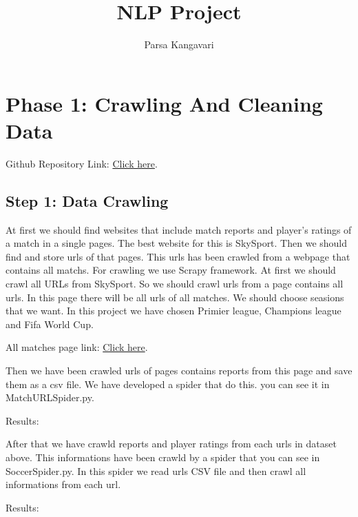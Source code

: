 \documentclass{article}
\title{NLP Project}
\author{Parsa Kangavari}
\begin{document}
 
\maketitle

\section{Phase 1: Crawling And Cleaning Data}
Github Repository Link: \href{https://github.com/rezakongo/soccer_report_analyst}{Click here}.


\subsection{Step 1: Data Crawling}
At first we should find websites that include match reports and player's ratings of a match in a single pages. The best website for this is SkySport.
Then we should find and store urls of that pages. This urls has been crawled from a webpage that contains all matchs. For crawling we use Scrapy framework.
At first we should crawl all URLs from SkySport. So we should crawl urls from a page contains all urls. In this page there will be all urls of all matches.
We should choose seasions that we want. In this project we have chosen Primier league, Champions league and Fifa World Cup.

All matches page link: \href{https://www.skysports.com/premier-league-results}{Click here}.


Then we have been crawled urls of pages contains reports from this page and save them as a csv file. We have developed a spider that do this. you can see it in MatchURLSpider.py.

Results:
\begin{table}
    \begin{center}
    \end{center}
\end{table}


After that we have crawld reports and player ratings from each urls in dataset above. This informations have been crawld by a spider that you can see in SoccerSpider.py.
In this spider we read urls CSV file and then crawl all informations from each url.

Results: 
\begin{table}
    \begin{center}
    \end{center}
\end{table}
\end{document}
